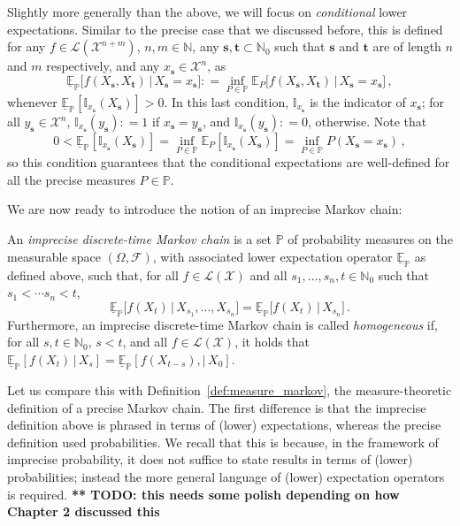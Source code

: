 \documentclass[graybox]{svmult}
\newcommand{\nats}{\mathbb{N}}
\newcommand{\natswith}{\nats_{0}}
\newcommand{\states}{\mathcal{X}}
\newcommand{\gambles}{\mathcal{L}}
\newcommand{\gamblesX}{\gambles(\states)}
\newcommand{\coloneqq}{:\!=}
\begin{document}
Slightly more generally than the above, we will focus on \emph{conditional} lower expectations. Similar to the precise case that we discussed before, this is defined for any $f\in\gambles(\states^{n+m})$, $n,m\in\nats$, any $\mathbf{s},\mathbf{t}\subset\natswith$ such that $\mathbf{s}$ and $\mathbf{t}$ are of length $n$ and $m$ respectively, and any $x_\mathbf{s}\in\states^n$, as
\begin{equation*}
\underline{\mathbb{E}}_\mathbb{P}\bigl[f(X_\mathbf{s},X_\mathbf{t})\,\big\vert\,X_\mathbf{s}=x_\mathbf{s}\bigr] \coloneqq \inf_{P\in\mathbb{P}} \mathbb{E}_P \bigl[f(X_\mathbf{s},X_\mathbf{t})\,\big\vert\,X_\mathbf{s}=x_\mathbf{s}\bigr]\,,
\end{equation*}
whenever $\underline{\mathbb{E}}_\mathbb{P}[\mathbb{I}_{x_\mathbf{s}}(X_\mathbf{s})]>0$. In this last condition, $\mathbb{I}_{x_\mathbf{s}}$ is the indicator of $x_\mathbf{s}$; for all $y_\mathbf{s}\in\states^n$, $\mathbb{I}_{x_\mathbf{s}}(y_\mathbf{s})\coloneqq 1$ if $x_\mathbf{s}=y_\mathbf{s}$, and $\mathbb{I}_{x_\mathbf{s}}(y_\mathbf{s})\coloneqq 0$, otherwise. Note that
\begin{equation*}
0 < \underline{\mathbb{E}}_\mathbb{P}[\mathbb{I}_{x_\mathbf{s}}(X_\mathbf{s})] = \inf_{P\in\mathbb{P}} \mathbb{E}_P[\mathbb{I}_{x_\mathbf{s}}(X_\mathbf{s})] = \inf_{P\in\mathbb{P}} P(X_\mathbf{s}=x_\mathbf{s})\,,
\end{equation*}
so this condition guarantees that the conditional expectations are well-defined for all the precise measures $P\in\mathbb{P}$.

We are now ready to introduce the notion of an imprecise Markov chain:
\begin{definition}
An \emph{imprecise discrete-time Markov chain} is a set $\mathbb{P}$ of probability measures on the measurable space $(\Omega,\mathcal{F})$, with associated lower expectation operator $\underline{\mathbb{E}}_\mathbb{P}$ as defined above, such that, for all $f\in\gambles(\states)$ and all $s_1,\ldots,s_n,t\in\natswith$ such that $s_1<\cdots s_n<t$,
\begin{equation*}
\underline{\mathbb{E}}_\mathbb{P}\bigl[f(X_t)\,\big\vert\, X_{s_1},\ldots,X_{s_n}\bigr] = \underline{\mathbb{E}}_\mathbb{P}\bigl[f(X_t)\,\big\vert\, X_{s_n}\bigr]\,.
\end{equation*}
Furthermore, an imprecise discrete-time Markov chain is called \emph{homogeneous} if, for all $s,t\in\natswith$, $s<t$, and all $f\in\gamblesX$, it holds that $\underline{\mathbb{E}}_\mathbb{P}[f(X_t)\,\vert\,X_s]= \underline{\mathbb{E}}_\mathbb{P}[f(X_{t-s}),\vert\,X_0]$.
\end{definition}
Let us compare this with Definition~\ref{def:measure_markov}, the measure-theoretic definition of a precise Markov chain. The first difference is that the imprecise definition above is phrased in terms of (lower) expectations, whereas the precise definition used probabilities. We recall that this is because, in the framework of imprecise probability, it does not suffice to state results in terms of (lower) probabilities; instead the more general language of (lower) expectation operators is required. {\bf *** TODO: this needs some polish depending on how Chapter 2 discussed this}
\end{document}
